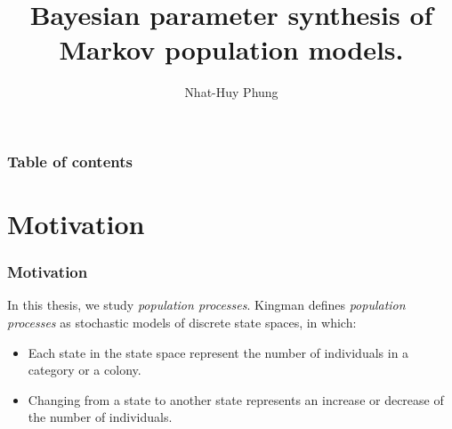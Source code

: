 \documentclass{beamer}
\begin{document}
\title{Bayesian parameter synthesis of Markov population models.}
\author{Nhat-Huy Phung}

\begin{frame}
  \titlepage
\end{frame}

\begin{frame}
  \frametitle{Table of contents}
  \tableofcontents
\end{frame}

\section{Motivation}
\begin{frame}
  \frametitle{Motivation}
  In this thesis, we study \textit{population processes}. Kingman
  \cite{10.2307/3212273} defines \textit{population
    processes} as stochastic models of discrete state spaces, in which:
  \begin{itemize}
  \item Each state in the state space represent the number of individuals in a
    category or a colony.
  \item Changing from a state to another state represents an increase or
    decrease of the number of individuals.
  \end{itemize}
\end{frame}
\end{document}
